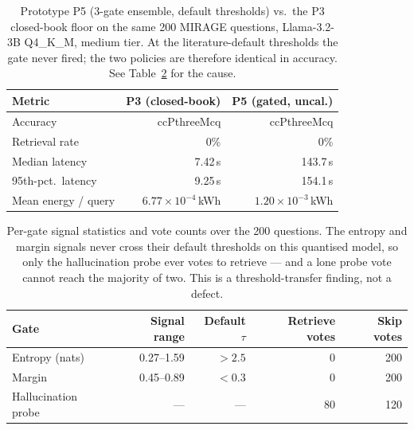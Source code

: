 \begin{table}[ht]
  \centering
  \caption{Prototype P5 (3-gate ensemble, default thresholds) vs.\ the P3
           closed-book floor on the same 200 MIRAGE questions, Llama-3.2-3B
           Q4\_K\_M, medium tier. At the literature-default thresholds the gate
           never fired; the two policies are therefore identical in accuracy.
           See Table~\ref{tab:p5-gatevotes} for the cause.}
  \label{tab:p5-prototype}
  \begin{tabular}{lrr}
    \toprule
    \textbf{Metric} & \textbf{P3 (closed-book)} & \textbf{P5 (gated, uncal.)} \\
    \midrule
    Accuracy            & ccPthreeMcq & ccPthreeMcq \\
    Retrieval rate      & 0\%    & 0\% \\
    Median latency      & 7.42\,s & 143.7\,s \\
    95th-pct.\ latency  & 9.25\,s & 154.1\,s \\
    Mean energy / query & $6.77\times10^{-4}$\,kWh & $1.20\times10^{-3}$\,kWh \\
    \bottomrule
  \end{tabular}
\end{table}

\begin{table}[ht]
  \centering
  \caption{Per-gate signal statistics and vote counts over the 200 questions.
           The entropy and margin signals never cross their default thresholds
           on this quantised model, so only the hallucination probe ever votes
           to retrieve --- and a lone probe vote cannot reach the majority of
           two. This is a threshold-transfer finding, not a defect.}
  \label{tab:p5-gatevotes}
  \begin{tabular}{lrrrr}
    \toprule
    \textbf{Gate} & \textbf{Signal range} & \textbf{Default $\tau$} &
    \textbf{Retrieve votes} & \textbf{Skip votes} \\
    \midrule
    Entropy (nats)        & 0.27--1.59 & $>2.5$  & 0   & 200 \\
    Margin                & 0.45--0.89 & $<0.3$  & 0   & 200 \\
    Hallucination probe   & ---        & ---     & 80  & 120 \\
    \bottomrule
  \end{tabular}
\end{table}

